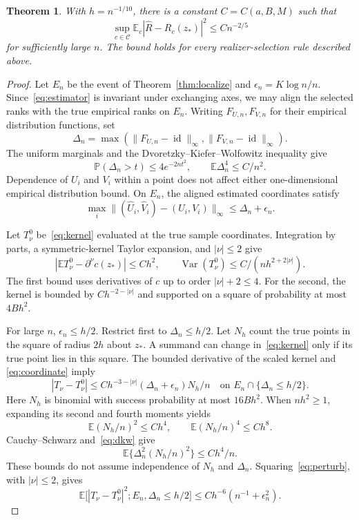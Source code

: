 \documentclass[11pt]{article}
\newtheorem{theorem}{Theorem}[section]
\theoremstyle{remark}
\newcommand{\E}{\mathbb E}
\newcommand{\Prob}{\mathbb P}
\newcommand{\calC}{\mathcal C}
\numberwithin{equation}{section}
\begin{document}
\begin{theorem}\label{thm:upper}
With $h=n^{-1/10}$, there is a constant $C=C(a,B,M)$ such that
\[
 \sup_{c\in\calC}\E_c|\widehat R-R_c(z_*)|^2\le Cn^{-2/5}
\]
for sufficiently large $n$.
The bound holds for every realizer-selection rule described above.
\end{theorem}
\begin{proof}
Let $E_n$ be the event of Theorem~\ref{thm:localize} and
$\epsilon_n=K\log n/n$.
Since~\eqref{eq:estimator} is invariant under exchanging axes,
we may align the selected ranks with the true empirical ranks on $E_n$.
Writing $F_{U,n},F_{V,n}$ for their empirical distribution functions,
set
\[
 \Delta_n=\max(\|F_{U,n}-\operatorname{id}\|_\infty,
                    \|F_{V,n}-\operatorname{id}\|_\infty).
\]
The uniform marginals and the Dvoretzky--Kiefer--Wolfowitz inequality
\cite{Massart} give
\begin{equation}\label{eq:dkw}
 \Prob(\Delta_n>t)\le4e^{-2nt^2},\qquad
 \E\Delta_n^4\le C/n^2.
\end{equation}
Dependence of $U_i$ and $V_i$ within a point does not affect either
one-dimensional empirical distribution bound.
On $E_n$, the aligned estimated coordinates satisfy
\begin{equation}\label{eq:coordinate}
 \max_i\|(\widehat U_i,\widehat V_i)-(U_i,V_i)\|_\infty
       \le\Delta_n+\epsilon_n.
\end{equation}

Let $T_\nu^0$ be~\eqref{eq:kernel} evaluated at the true sample
coordinates. Integration by parts, a symmetric-kernel Taylor expansion,
and $|\nu|\le2$ give
\begin{equation}\label{eq:oracle}
 |\E T_\nu^0-\partial^\nu c(z_*)|\le Ch^2,\qquad
 \operatorname{Var}(T_\nu^0)\le C/(nh^{2+2|\nu|}).
\end{equation}
The first bound uses derivatives of $c$ up to order $|\nu|+2\le4$.
For the second, the kernel is bounded by $Ch^{-2-|\nu|}$
and supported on a square of probability at most $4Bh^2$.

For large $n$, $\epsilon_n\le h/2$.
Restrict first to $\Delta_n\le h/2$.
Let $N_h$ count the true points in the square of radius $2h$ about
$z_*$.
A summand can change in~\eqref{eq:kernel} only if its true point lies
in this square. The bounded derivative of the scaled kernel and
\eqref{eq:coordinate} imply
\begin{equation}\label{eq:perturb}
 |T_\nu-T_\nu^0|
   \le Ch^{-3-|\nu|}(\Delta_n+\epsilon_n)N_h/n
                  \quad\text{on }E_n\cap\{\Delta_n\le h/2\}.
\end{equation}
Here $N_h$ is binomial with success probability at most $16Bh^2$.
When $nh^2\ge1$, expanding its second and fourth moments yields
\[
 \E(N_h/n)^2\le Ch^4,\qquad \E(N_h/n)^4\le Ch^8.
\]
Cauchy--Schwarz and~\eqref{eq:dkw} give
\[
 \E\{\Delta_n^2(N_h/n)^2\}\le Ch^4/n .
\]
These bounds do not assume independence of $N_h$ and $\Delta_n$.
Squaring~\eqref{eq:perturb}, with $|\nu|\le2$, gives
\[
 \E\bigl[|T_\nu-T_\nu^0|^2;
              E_n,\Delta_n\le h/2\bigr]
       \le C h^{-6}(n^{-1}+\epsilon_n^2).
\]


\end{proof}
\end{document}
